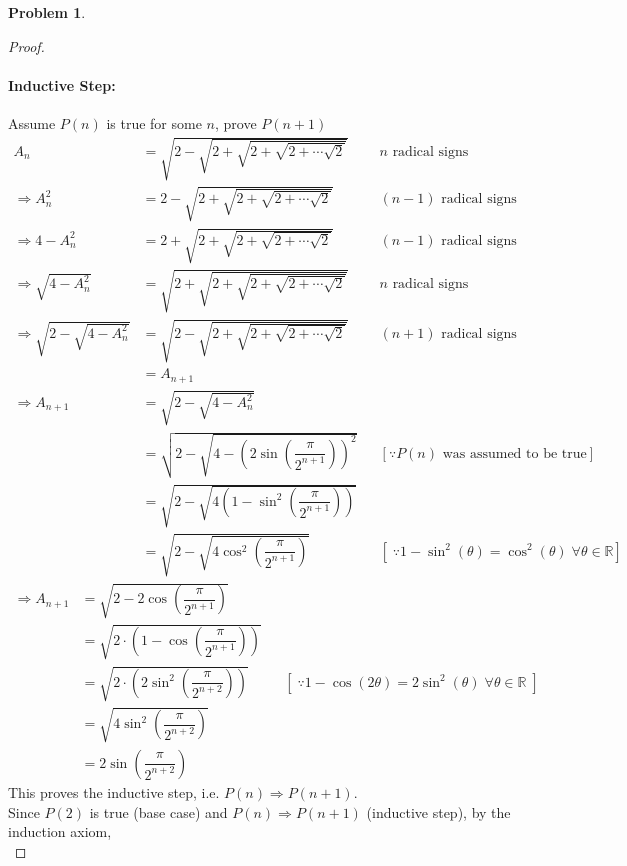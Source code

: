 \documentclass[14]{article}
\theoremstyle{definition}
\newtheorem{prob}{Problem}
\theoremstyle{case}
\begin{document}
\begin{prob}
\begin{proof}
\paragraph{Inductive Step:} Assume $P(n)$ is true for some $n$, prove $P(n + 1)$\\
\begin{align*}
A_n &= \sqrt{2 - \sqrt{2 + \sqrt{2 + \sqrt{2 + \cdots \sqrt{2}}}}} && n \text{ radical signs}\\
\Rightarrow A_n ^2 &= 2 - \sqrt{2 + \sqrt{2 + \sqrt{2 + \cdots \sqrt{2}}}} && (n-1) \text{ radical signs}\\
\Rightarrow 4 - A_n^2 &= 2 + \sqrt{2 + \sqrt{2 + \sqrt{2 + \cdots \sqrt{2}}}} && (n-1) \text{ radical signs}\\
\Rightarrow \sqrt{4 - A_n^2} &= \sqrt{2 + \sqrt{2 + \sqrt{2 + \sqrt{2 + \cdots \sqrt{2}}}}} && n \text{ radical signs}\\
\Rightarrow \sqrt{2 - \sqrt{4 - A_n^2}} &= \sqrt{2 - \sqrt{2 + \sqrt{2 + \sqrt{2 + \cdots \sqrt{2}}}}} && (n+1) \text{ radical signs}\\
&= A_{n+1}\\
\Rightarrow A_{n + 1} &= \sqrt{2 - \sqrt{4 - A_n^2}}\\
&= \sqrt{2 - \sqrt{4 - \left(2 \sin\left(\dfrac{\pi}{2^{n+1}}\right)\right)^2}} && \left[ \because P(n) \text{ was assumed to be true} \right]\\
&= \sqrt{2 - \sqrt{4 \left( 1 - \sin^2\left( \dfrac{\pi}{2^{n + 1}} \right) \right)}}\\
&= \sqrt{2 - \sqrt{4 \cos^2\left( \dfrac{\pi}{2^{n+1}} \right)}} && \left[\;\because 1 - \sin^2 (\theta) = \cos^2(\theta) \; \forall \theta \in \mathbb{R}\right]
\end{align*}
\pagebreak
\begin{align*}
\Rightarrow A_{n + 1} &= \sqrt{2 - 2 \cos\left( \dfrac{\pi}{2^{n+1}} \right)}\\
&= \sqrt{2\cdot \left(1 - \cos\left( \dfrac{\pi}{2^{n+1}} \right)\right)}\\
&= \sqrt{2\cdot \left(2 \sin^2\left( \dfrac{\pi}{2^{n+2}} \right)\right)} && \left[\;\because 1 - \cos(2\theta) = 2\sin^2(\theta) \; \forall \theta \in \mathbb{R}\;\right]\\
&= \sqrt{4\sin^2\left(\dfrac{\pi}{2^{n+2}}\right)}\\
&= 2\sin\left(\dfrac{\pi}{2^{n+2}}\right)
\end{align*}
This proves the inductive step, i.e. $P(n) \Rightarrow P(n+1)$.\\
Since $P(2)$ is true (base case) and $P(n) \Rightarrow P(n+1)$ (inductive step), by the induction axiom,\\

\end{proof}
\end{prob}
\end{document}
